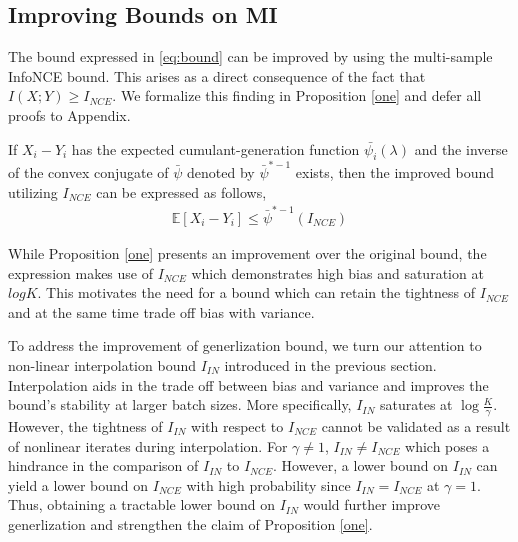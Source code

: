 \documentclass{article}
\begin{document}
\subsection{Improving Bounds on MI}
The bound expressed in \autoref{eq:bound} can be improved by using the multi-sample InfoNCE bound. This arises as a direct consequence of the fact that $I(X;Y) \geq I_{NCE}$. We formalize this finding in Proposition \autoref{one} and defer all proofs to Appendix. 
\begin{customthm}{1}\label{one}
  If $X_{i}-Y_{i}$ has the expected cumulant-generation function $\bar{\psi_{i}}(\lambda)$ and the inverse of the convex conjugate of $\bar{\psi}$ denoted by $\bar{\psi}^{*-1}$ exists, then the improved bound utilizing $I_{NCE}$ can be expressed as follows,
\begin{gather}
  \mathbb{E}[X_{i} - Y_{i}] \leq \bar{\psi}^{*-1}(I_{NCE}) \label{eq:newbound}
\end{gather} 
\end{customthm}
While Proposition \autoref{one} presents an improvement over the original bound, the expression makes use of $I_{NCE}$ which demonstrates high bias and saturation at $log K$. This motivates the need for a bound which can retain the tightness of $I_{NCE}$ and at the same time trade off bias with variance. 

To address the improvement of generlization bound, we turn our attention to non-linear interpolation bound $I_{IN}$ introduced in the previous section. Interpolation aids in the trade off between bias and variance and improves the bound's stability at larger batch sizes. More specifically, $I_{IN}$ saturates at $\log \frac{K}{\gamma}$. However, the tightness of $I_{IN}$ with respect to $I_{NCE}$ cannot be validated as a result of nonlinear iterates during interpolation. For $\gamma\neq 1$, $I_{IN} \neq I_{NCE}$ which poses a hindrance in the comparison of $I_{IN}$ to $I_{NCE}$. However, a lower bound on $I_{IN}$ can yield a lower bound on $I_{NCE}$ with high probability since $I_{IN} = I_{NCE}$ at $\gamma=1$. Thus, obtaining a tractable lower bound on $I_{IN}$ would further improve generlization and strengthen the claim of Proposition \autoref{one}. 
\end{document}
